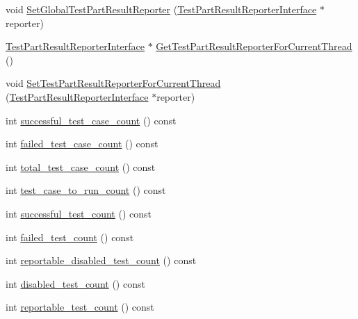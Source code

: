 \begin{DoxyCompactItemize}
\item 
void \hyperlink{classtesting_1_1internal_1_1_unit_test_impl_a892b0e25b28af5e4400cf6fac336f2d8}{Set\-Global\-Test\-Part\-Result\-Reporter} (\hyperlink{classtesting_1_1_test_part_result_reporter_interface}{Test\-Part\-Result\-Reporter\-Interface} $\ast$reporter)
\item 
\hyperlink{classtesting_1_1_test_part_result_reporter_interface}{Test\-Part\-Result\-Reporter\-Interface} $\ast$ \hyperlink{classtesting_1_1internal_1_1_unit_test_impl_a816455636f396c48e203f505d27ab770}{Get\-Test\-Part\-Result\-Reporter\-For\-Current\-Thread} ()
\item 
void \hyperlink{classtesting_1_1internal_1_1_unit_test_impl_a1403fc10aebcc64479c5ee980c9b4eb4}{Set\-Test\-Part\-Result\-Reporter\-For\-Current\-Thread} (\hyperlink{classtesting_1_1_test_part_result_reporter_interface}{Test\-Part\-Result\-Reporter\-Interface} $\ast$reporter)
\item 
int \hyperlink{classtesting_1_1internal_1_1_unit_test_impl_a549c383b4d21bfd4b60d3d6aa2ac1949}{successful\-\_\-test\-\_\-case\-\_\-count} () const 
\item 
int \hyperlink{classtesting_1_1internal_1_1_unit_test_impl_a09dd83b48ef2082fab162e8792eaa295}{failed\-\_\-test\-\_\-case\-\_\-count} () const 
\item 
int \hyperlink{classtesting_1_1internal_1_1_unit_test_impl_ab5049f53312560726fa7f05924bfdade}{total\-\_\-test\-\_\-case\-\_\-count} () const 
\item 
int \hyperlink{classtesting_1_1internal_1_1_unit_test_impl_a60c6be6043fd7789d6575a5cb21a7fff}{test\-\_\-case\-\_\-to\-\_\-run\-\_\-count} () const 
\item 
int \hyperlink{classtesting_1_1internal_1_1_unit_test_impl_a8beb6a8a95d51790fb081e3a0e9aac34}{successful\-\_\-test\-\_\-count} () const 
\item 
int \hyperlink{classtesting_1_1internal_1_1_unit_test_impl_a9f272a89c64be1801145364cd8753b05}{failed\-\_\-test\-\_\-count} () const 
\item 
int \hyperlink{classtesting_1_1internal_1_1_unit_test_impl_acd5e7483191cf49af70d699e06ea1af1}{reportable\-\_\-disabled\-\_\-test\-\_\-count} () const 
\item 
int \hyperlink{classtesting_1_1internal_1_1_unit_test_impl_ae5239c776abba66170ba84d1c7cee235}{disabled\-\_\-test\-\_\-count} () const 
\item 
int \hyperlink{classtesting_1_1internal_1_1_unit_test_impl_a29df296bc910ce1cf4a088b529e2f396}{reportable\-\_\-test\-\_\-count} () const 

\end{DoxyCompactItemize}
